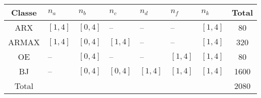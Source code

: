 \setlength{\extrarowheight}{1pt}
\begin{tabularx}{\linewidth}{@{} c *{6}{C} c @{}}
  \toprule
  Classe & $n_a$    & $n_b$    & $n_c$    & $n_d$    & $n_f$    & $n_k$    & Total \\
  \midrule
  ARX    & $[1, 4]$ & $[0, 4]$ & --       & --       & --       & $[1, 4]$ & 80    \\
  ARMAX  & $[1, 4]$ & $[0, 4]$ & $[1, 4]$ & --       & --       & $[1, 4]$ & 320   \\
  OE     & --       & $[0, 4]$ & --       & --       & $[1, 4]$ & $[1, 4]$ & 80    \\
  BJ     & --       & $[0, 4]$ & $[0, 4]$ & $[1, 4]$ & $[1, 4]$ & $[1, 4]$ & 1600  \\
  \midrule
  Total  &          &          &          &          &          &          & 2080  \\
  \bottomrule
\end{tabularx}